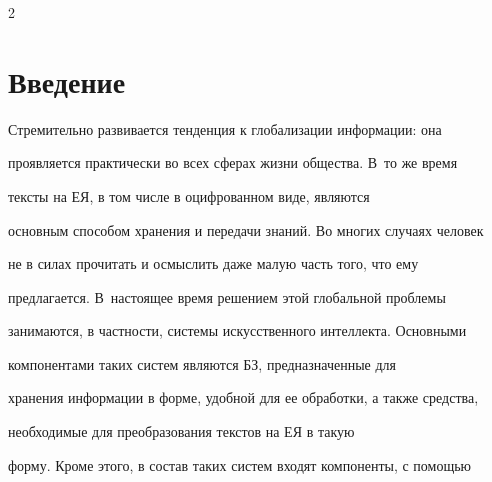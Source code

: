 

















\thispagestyle{headings}





\begin{multicols}{2}





\label{st\stat}








\section{Введение} %





 Стремительно развивается тенденция к глобализации информации: она


проявляется практически во всех сферах жизни общества. В~то же время


тексты на ЕЯ, в том числе в оцифрованном виде, являются


основным способом хранения и передачи знаний. Во многих случаях человек


не в силах прочитать и осмыслить даже малую часть того, что ему


предлагается. В~настоящее время решением этой глобальной проблемы


занимаются, в частности, системы искусственного интеллекта. Основными


компонентами таких систем являются БЗ, предназначенные для


хранения информации в форме, удобной для ее обработки, а также средства,


необходимые для преобразования текстов на ЕЯ в такую


форму. Кроме этого, в состав таких систем входят компоненты, с помощью



\end{multicols}
